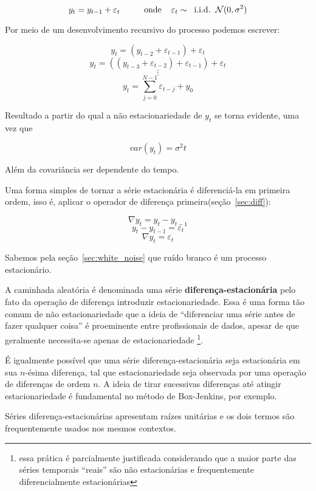 $$  y_t = y_{t-1} + \varepsilon_t  \hspace{1cm}\text{onde} \hspace{.4cm}\varepsilon_t \sim \hspace{.2cm}\text{i.i.d.} \hspace{.2cm}\mathcal{N}(0, \sigma^2)$$

Por meio de um desenvolvimento recursivo do processo podemos escrever:

$$ y_t = (y_{t-2} + \varepsilon_{t-1}) + \varepsilon_{t} $$
$$ y_t = ((y_{t-3} + \varepsilon_{t-2}) + \varepsilon_{t-1}) + \varepsilon_{t} $$
$$ \vdots $$
$$ y_t = \sum_{j=0}^{N-1} \varepsilon_{t-j} + y_0$$
\vspace{1cm}

Resultado a partir do qual a não estacionariedade de $y_t$ se torna evidente,
uma vez que

$$ var(y_t) = \sigma^2 t $$

Além da covariância ser dependente do tempo.

Uma forma simples de tornar a série estacionária é diferenciá-la em primeira
ordem, isso é, aplicar o operador de diferença primeira(seção~\ref{sec:diff}):

$$ \nabla y_t = y_t - y_{t-1} $$
$$ y_t - y_{t-1} = \varepsilon_t$$
$$ \nabla y_t =  \varepsilon_t$$

Sabemos pela seção~\ref{sec:white_noise} que ruído branco é um processo
estacionário.

A caminhada aleatória é denominada uma série \textbf{diferença-estacionária}
pelo fato da operação de diferença introduzir estacionariedade. Essa é uma
forma tão comum de não estacionariedade que a ideia de ``diferenciar uma
série antes de fazer qualquer coisa'' é proeminente entre profissionais de
dados, apesar de que geralmente necessita-se apenas de estacionariedade
\footnote{essa prática é parcialmente justificada considerando que a maior
parte das séries temporais ``reais'' são não estacionárias e frequentemente
diferencialmente estacionárias}.

É igualmente possível que uma série diferença-estacionária seja estacionária em
sua $n$-ésima diferença, tal que estacionariedade seja observada por uma
operação de diferenças de ordem $n$. A ideia de tirar sucessivas diferenças
até atingir estacionariedade é fundamental no método de Box-Jenkins, por
exemplo.

Séries diferença-estacionárias apresentam raízes unitárias e os dois termos são
frequentemente usados nos mesmos contextos.


